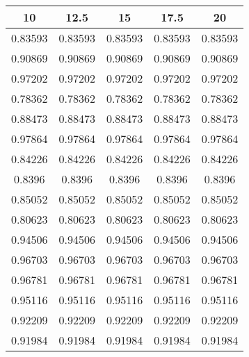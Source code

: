 \begin{tabular}{|c|c|c|c|c|}
\hline 
10 & 12.5 & 15 & 17.5 & 20 \\ 
\hline 
0.83593 & 0.83593 & 0.83593 & 0.83593 & 0.83593 \\ 
0.90869 & 0.90869 & 0.90869 & 0.90869 & 0.90869 \\ 
0.97202 & 0.97202 & 0.97202 & 0.97202 & 0.97202 \\ 
0.78362 & 0.78362 & 0.78362 & 0.78362 & 0.78362 \\ 
0.88473 & 0.88473 & 0.88473 & 0.88473 & 0.88473 \\ 
0.97864 & 0.97864 & 0.97864 & 0.97864 & 0.97864 \\ 
0.84226 & 0.84226 & 0.84226 & 0.84226 & 0.84226 \\ 
0.8396 & 0.8396 & 0.8396 & 0.8396 & 0.8396 \\ 
0.85052 & 0.85052 & 0.85052 & 0.85052 & 0.85052 \\ 
0.80623 & 0.80623 & 0.80623 & 0.80623 & 0.80623 \\ 
0.94506 & 0.94506 & 0.94506 & 0.94506 & 0.94506 \\ 
0.96703 & 0.96703 & 0.96703 & 0.96703 & 0.96703 \\ 
0.96781 & 0.96781 & 0.96781 & 0.96781 & 0.96781 \\ 
0.95116 & 0.95116 & 0.95116 & 0.95116 & 0.95116 \\ 
0.92209 & 0.92209 & 0.92209 & 0.92209 & 0.92209 \\ 
0.91984 & 0.91984 & 0.91984 & 0.91984 & 0.91984 \\ 
\hline 
\end{tabular}